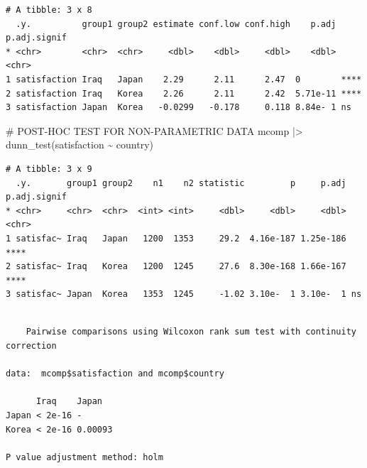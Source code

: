 \documentclass[
  letterpaper,
]{krantz}
\makeatletter
\newenvironment{Shaded}{\begin{snugshade}}{\end{snugshade}}
\newcommand{\AlertTok}[1]{\textcolor[rgb]{0.68,0.00,0.00}{#1}}
\newcommand{\AttributeTok}[1]{\textcolor[rgb]{0.40,0.45,0.13}{#1}}
\newcommand{\CommentTok}[1]{\textcolor[rgb]{0.37,0.37,0.37}{#1}}
\newcommand{\FunctionTok}[1]{\textcolor[rgb]{0.28,0.35,0.67}{#1}}
\newcommand{\NormalTok}[1]{\textcolor[rgb]{0.00,0.23,0.31}{#1}}
\newcommand{\SpecialCharTok}[1]{\textcolor[rgb]{0.37,0.37,0.37}{#1}}
\newcommand{\StringTok}[1]{\textcolor[rgb]{0.13,0.47,0.30}{#1}}
\newenvironment{kframe}{%
\medskip{}
\setlength{\fboxsep}{.8em}
 \def\at@end@of@kframe{}%
 \ifinner\ifhmode%
  \def\at@end@of@kframe{\end{minipage}}%
  \begin{minipage}{\columnwidth}%
 \fi\fi%
 \def\FrameCommand##1{\hskip\@totalleftmargin \hskip-\fboxsep
 \colorbox{shadecolor}{##1}\hskip-\fboxsep
     \hskip-\linewidth \hskip-\@totalleftmargin \hskip\columnwidth}%
 \MakeFramed {\advance\hsize-\width
   \@totalleftmargin\z@ \linewidth\hsize
   \@setminipage}}%
 {\par\unskip\endMakeFramed%
 \at@end@of@kframe}
\renewenvironment{Shaded}{\begin{kframe}}{\end{kframe}}
\makeatother
\begin{document}
\begin{verbatim}
# A tibble: 3 x 8
  .y.          group1 group2 estimate conf.low conf.high    p.adj p.adj.signif
* <chr>        <chr>  <chr>     <dbl>    <dbl>     <dbl>    <dbl> <chr>       
1 satisfaction Iraq   Japan    2.29      2.11      2.47  0        ****        
2 satisfaction Iraq   Korea    2.26      2.11      2.42  5.71e-11 ****        
3 satisfaction Japan  Korea   -0.0299   -0.178     0.118 8.84e- 1 ns          
\end{verbatim}

\begin{Shaded}
\begin{Highlighting}[]
\CommentTok{\# POST{-}HOC }\AlertTok{TEST}\CommentTok{ FOR NON{-}PARAMETRIC DATA}
\NormalTok{mcomp }\SpecialCharTok{|\textgreater{}} \FunctionTok{dunn\_test}\NormalTok{(satisfaction }\SpecialCharTok{\textasciitilde{}}\NormalTok{ country)}
\end{Highlighting}
\end{Shaded}

\begin{verbatim}
# A tibble: 3 x 9
  .y.       group1 group2    n1    n2 statistic         p     p.adj p.adj.signif
* <chr>     <chr>  <chr>  <int> <int>     <dbl>     <dbl>     <dbl> <chr>       
1 satisfac~ Iraq   Japan   1200  1353     29.2  4.16e-187 1.25e-186 ****        
2 satisfac~ Iraq   Korea   1200  1245     27.6  8.30e-168 1.66e-167 ****        
3 satisfac~ Japan  Korea   1353  1245     -1.02 3.10e-  1 3.10e-  1 ns          
\end{verbatim}

\begin{Shaded}
\end{Shaded}

\begin{verbatim}

    Pairwise comparisons using Wilcoxon rank sum test with continuity correction 

data:  mcomp$satisfaction and mcomp$country 

      Iraq    Japan  
Japan < 2e-16 -      
Korea < 2e-16 0.00093

P value adjustment method: holm 
\end{verbatim}
\end{document}
